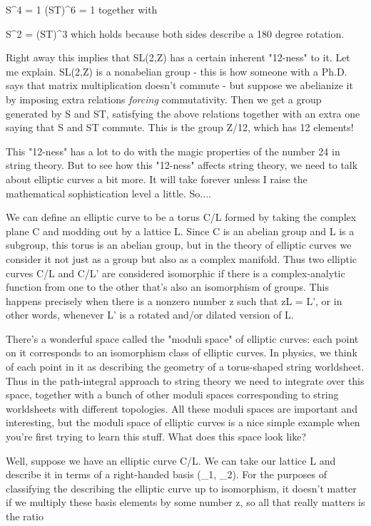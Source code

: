                              S^{4} = 1
                          (ST)^{6} = 1
together with

                          S^{2} = (ST)^{3}
which holds because both sides describe a 180 degree rotation.

Right away this implies that SL(2,Z) has a certain inherent "12-ness" to
it.  Let me explain.  SL(2,Z) is a nonabelian group - this is how
someone with a Ph.D. says that matrix multiplication doesn't commute -
but suppose we abelianize it by imposing extra relations \emph{forcing}
commutativity.  Then we get a group generated by S and ST, satisfying
the above relations together with an extra one saying that S and ST
commute.  This is the group Z/12, which has 12 elements!

This "12-ness" has a lot to do with the magic properties of the number
24 in string theory.  But to see how this "12-ness" affects string
theory, we need to talk about elliptic curves a bit more.   It will take
forever unless I raise the mathematical sophistication level a little. 
So....

We can define an elliptic curve to be a torus C/L formed by taking the 
complex plane C and modding out by a lattice L.   Since C is an abelian
group and L is a subgroup, this torus is an abelian group, but in the
theory of elliptic curves we consider it not just as a group but also as
a complex manifold.  Thus two elliptic curves C/L and C/L' are
considered isomorphic if there is a complex-analytic function from one
to the other that's also an isomorphism of groups.  This happens
precisely when there is a nonzero number z such that zL = L', or in
other words, whenever L' is a rotated and/or dilated version of L.   

There's a wonderful space called the "moduli space" of elliptic
curves: each point on it corresponds to an isomorphism class of
elliptic curves.  In physics, we think of each point in it as
describing the geometry of a torus-shaped string worldsheet.  Thus in
the path-integral approach to string theory we need to integrate over
this space, together with a bunch of other moduli spaces corresponding
to string worldsheets with different topologies.  All these moduli
spaces are important and interesting, but the moduli space of elliptic
curves is a nice simple example when you're first trying to learn this
stuff.  What does this space look like?

Well, suppose we have an elliptic curve C/L.  We can take our lattice
L and describe it in terms of a right-handed basis (\omega _{1}, \omega _{2}).
For the purposes of classifying the describing the elliptic curve up
to isomorphism, it doesn't matter if we multiply these basis elements
by some number z, so all that really matters is the ratio

